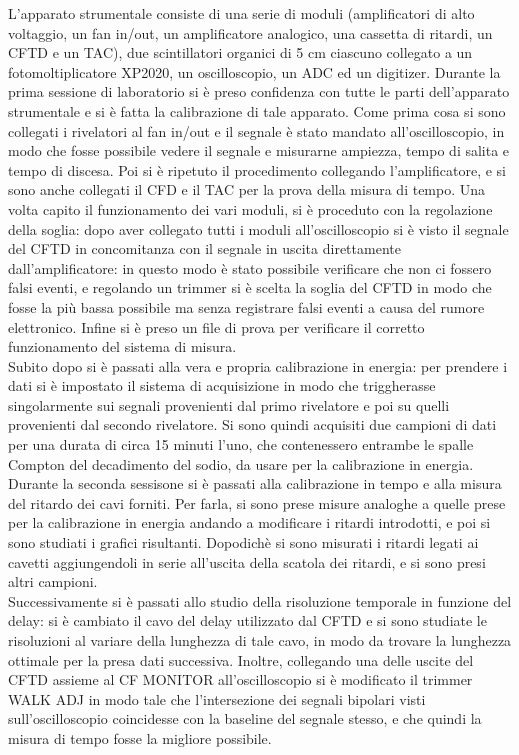 L'apparato strumentale consiste di una serie di moduli (amplificatori di alto voltaggio, un fan in/out, un amplificatore analogico, una cassetta di ritardi, un CFTD e un TAC),
due scintillatori organici di 5 cm ciascuno collegato a un fotomoltiplicatore XP2020,  un oscilloscopio, un ADC ed un digitizer.
Durante la prima sessione di laboratorio si è preso confidenza con tutte le parti dell'apparato
strumentale e si è fatta la calibrazione di tale apparato. Come prima cosa si sono collegati i rivelatori al fan in/out e il segnale è stato mandato all'oscilloscopio,
in modo che fosse possibile vedere il segnale e misurarne ampiezza, tempo di salita e tempo di discesa. Poi si è ripetuto il procedimento collegando l'amplificatore, e si
sono anche collegati il CFD e il TAC per la prova della misura di tempo. Una volta capito il funzionamento dei vari moduli, si è proceduto con la regolazione della soglia:
dopo aver collegato tutti i moduli all'oscilloscopio si è visto il segnale del CFTD in concomitanza con il segnale in uscita direttamente dall'amplificatore: in
questo modo è stato possibile verificare che non ci fossero falsi eventi, e regolando un trimmer si è scelta la soglia del CFTD in modo che fosse la più bassa possibile
ma senza registrare falsi eventi a causa del rumore elettronico. Infine si è preso un file di prova per verificare il corretto funzionamento del sistema di misura.\\

Subito dopo si è passati alla vera e propria calibrazione in energia: per prendere i dati si è impostato il sistema di acquisizione in modo che triggherasse singolarmente
sui segnali provenienti dal primo rivelatore e poi su quelli provenienti dal secondo rivelatore. Si sono quindi acquisiti due campioni di dati per una durata di circa 
15 minuti l'uno, che
contenessero entrambe le spalle Compton del decadimento del sodio, da usare per la calibrazione in energia.\\

Durante la seconda sessisone si è passati alla calibrazione in tempo e alla misura del ritardo dei cavi forniti. Per farla, si sono prese misure analoghe a quelle prese per la calibrazione in
energia andando a modificare i ritardi introdotti, e poi si sono studiati i grafici risultanti. Dopodichè si sono misurati i ritardi legati ai cavetti aggiungendoli
in serie all'uscita della scatola dei ritardi, e si sono presi altri campioni.\\

Successivamente si è passati allo studio della risoluzione temporale in funzione del delay: si è cambiato il cavo del delay utilizzato dal CFTD e si sono studiate le
risoluzioni al variare della lunghezza di tale cavo, in modo da trovare la lunghezza ottimale per la presa dati successiva. Inoltre, collegando una delle uscite del
CFTD assieme al CF MONITOR all'oscilloscopio si è modificato il trimmer WALK ADJ in modo tale che l'intersezione dei segnali bipolari visti sull'oscilloscopio
coincidesse con la baseline del segnale stesso, e che quindi la misura di tempo fosse la migliore possibile.\\

